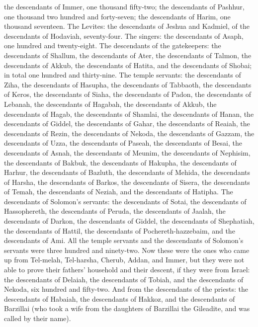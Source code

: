 \begin{biblechapter}
\verse the descendants of Immer, one thousand fifty-two;
\verse the descendants of Pashhur, one thousand two hundred and forty-seven;
\verse the descendants of Harim, one thousand seventeen.
\verse The Levites: the descendants of Jeshua and Kadmiel, of the descendants of Hodaviah, seventy-four.
\verse The singers: the descendants of Asaph, one hundred and twenty-eight.
\verse The descendants of the gatekeepers: the descendants of Shallum, the descendants of Ater, the descendants of Talmon, the descendants of Akkub, the descendants of Hatita, and the descendants of Shobai; in total one hundred and thirty-nine.
\verse The temple servants: the descendants of Ziha, the descendants of Hasupha, the descendants of Tabbaoth,
\verse the descendants of Keros, the descendants of Siaha, the descendants of Padon,
\verse the descendants of Lebanah, the descendants of Hagabah, the descendants of Akkub,
\verse the descendants of Hagab, the descendants of Shamlai, the descendants of Hanan,
\verse the descendants of Giddel, the descendants of Gahar, the descendants of Reaiah,
\verse the descendants of Rezin, the descendants of Nekoda, the descendants of Gazzam,
\verse the descendants of Uzza, the descendants of Paseah, the descendants of Besai,
\verse the descendants of Asnah, the descendants of Meunim, the descendants of Nephisim,
\verse the descendants of Bakbuk, the descendants of Hakupha, the descendants of Harhur,
\verse the descendants of Bazluth, the descendants of Mehida, the descendants of Harsha,
\verse the descendants of Barkos, the descendants of Sisera, the descendants of Temah,
\verse the descendants of Neziah, and the descendants of Hatipha.
\verse The descendants of Solomon’s servants: the descendants of Sotai, the descendants of Hassophereth, the descendants of Peruda,
\verse the descendants of Jaalah, the descendants of Darkon, the descendants of Giddel,
\verse the descendants of Shephatiah, the descendants of Hattil, the descendants of Pochereth-hazzebaim, and the descendants of Ami.
\verse All the temple servants and the descendants of Solomon’s servants were three hundred and ninety-two.
\verse Now these were the ones who came up from Tel-melah, Tel-harsha, Cherub, Addan, and Immer, but they were not able to prove their fathers’ household and their descent, if they were from Israel:
\verse the descendants of Delaiah, the descendants of Tobiah, and the descendants of Nekoda, six hundred and fifty-two.
\verse And from the descendants of the priests: the descendants of Habaiah, the descendants of Hakkoz, and the descendants of Barzillai (who took a wife from the daughters of Barzillai the Gileadite, and was called by their name).

\end{biblechapter}
